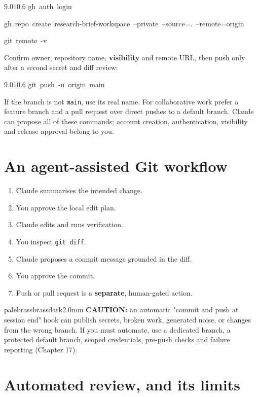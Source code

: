 \documentclass[11pt,a4paper,twoside,openany]{book}
\newcommand{\cl}[1]{\noindent\mbox{#1}\par}
\begin{document}
\begin{codeblock}{9.0}{10.6}
\cl{gh~auth~login}
\cl{gh~repo~create~research-brief-workspace~--private~--source=.~--remote=origin}
\cl{git~remote~-v}
\end{codeblock}

Confirm owner, repository name, \textbf{visibility} and remote URL, then push only after a second secret and diff review:


\begin{codeblock}{9.0}{10.6}
\cl{git~push~-u~origin~main}
\end{codeblock}

If the branch is not \texttt{main}, use its real name. For collaborative work prefer a feature branch and a pull request over direct pushes to a default branch. Claude can propose all of these commands; account creation, authentication, visibility and release approval belong to you.


\FloatBarrier
\setcounter{section}{2}
\section{An agent-assisted Git workflow}

\begin{enumerate}
\item Claude summarises the intended change.
\item You approve the local edit plan.
\item Claude edits and runs verification.
\item You inspect \texttt{git diff}.
\item Claude proposes a commit message grounded in the diff.
\item You approve the commit.
\item Push or pull request is a \textbf{separate}, human-gated action.
\end{enumerate}

\begin{calloutbox}{palebrass}{brassdark}{2.0mm}
\textbf{CAUTION:} an automatic "commit and push at session end" hook can publish secrets, broken work, generated noise, or changes from the wrong branch. If you must automate, use a dedicated branch, a protected default branch, scoped credentials, pre-push checks and failure reporting (Chapter 17).
\end{calloutbox}

\FloatBarrier
\setcounter{section}{3}
\section{Automated review, and its limits}
\end{document}
